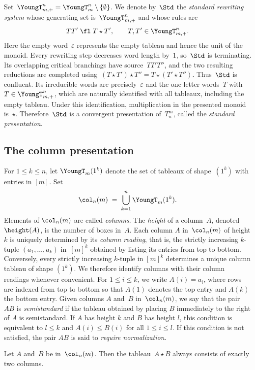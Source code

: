 \documentclass[a4paper, twoside, 11pt, english]{article}
\begin{document}
Set~$\YoungT_{m,+}^n=\YoungT_m^n\setminus\{\emptyset\}$.
We denote by~$\Std$ the \emph{standard rewriting system} whose generating
set is~$\YoungT_{m,+}^n$ and whose rules are
\[
TT'\;\fl\;T\star T',
\qquad
T,T'\in\YoungT_{m,+}^n.
\]
Here the empty word~$\varepsilon$ represents the empty tableau and hence the
unit of the monoid.
Every rewriting step decreases word length by~$1$, so~$\Std$ is terminating.
Its overlapping critical branchings have source~$TT'T''$, and the two
resulting reductions are completed using~$(T\star T')\star T''=T\star(T'\star T'')$.
Thus~$\Std$ is confluent. Its irreducible words are precisely~$\varepsilon$ and the one-letter words~$T$ with
$T\in\YoungT_{m,+}^n$, which are naturally identified with all tableaux,
including the empty tableau. Under this identification, multiplication in
the presented monoid is~$\star$. Therefore~$\Std$ is a convergent
presentation of~$T_n^m$, called the \emph{standard presentation}.



\subsection{The column presentation}
\label{SS:ColumnPresentation}
For $1 \le k \le n$, let $\YoungT_m(1^k)$ denote the set of 
tableaux of shape~$(1^k)$ with entries in $[m]$.
Set
\[
\col_n(m) \;=\; \bigcup_{k=1}^n \YoungT_m(1^k).
\]
Elements of $\col_n(m)$ are called \emph{columns}.
The \emph{height} of a column~$A$, denoted~$\height(A)$, is the number of boxes in~$A$.
Each column $A$ in~$\col_n(m)$ of height $k$ is uniquely determined by its \emph{column reading}, that is, the strictly increasing $k$-tuple
$(a_1,\dots,a_k)$ in~$[m]^k$ obtained by listing its entries from top to bottom.
Conversely, every strictly increasing $k$-tuple in $[m]^k$ determines a unique column tableau of shape $(1^k)$.
We therefore identify columns with their column readings whenever convenient.
For $1\le i\le k$, we write $A(i)=a_i$, where rows are indexed from top to
bottom so that $A(1)$ denotes the top entry and $A(k)$ the bottom entry.
Given columns $A$ and~$B$ in~$\col_n(m)$, we say that the pair $AB$ is
\emph{semistandard} if the tableau obtained by placing $B$ immediately to the
right of $A$ is semistandard.
If $A$ has height $k$ and $B$ has height $l$, this condition is equivalent to
$l\le k$ and $A(i)\le B(i)$ for all $1\le i\le l$.
If this condition is not satisfied, the pair $AB$ is said to
\emph{require normalization}.


\begin{lemma}
\label{L:TwocolumnsLemmata}
Let $A$ and~$B$ be in~$\col_n(m)$.
Then the tableau~$A\star B$ always consists of exactly two columns.
\end{lemma}
\end{document}
